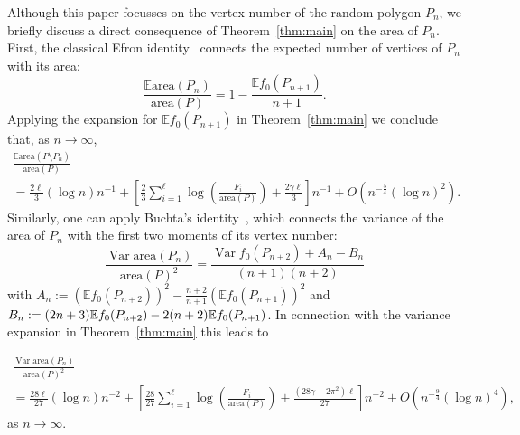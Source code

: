 \documentclass[AHL,Unicode,longabstracts,published]{cedram}
\newcommand{\var}{\operatorname{Var}}
\newcommand{\bbE}{\mathbb{E}}
\newcommand{\area}{\mathrm{area}}
\begin{document}
\begin{rema}
Although this paper focusses on the vertex number of the random polygon $P_n$, we briefly discuss a direct consequence of Theorem~\ref{thm:main} on the area of $P_n$. First, the classical Efron identity~\cite{Ef} connects the expected number of vertices of $P_n$ with its area:
\[
\frac{\bbE{\area}(P_n)}{{\area}(P)} = 1- \frac{\bbE f_0(P_{n+1})}{n+1}.
\]
Applying the expansion for $\bbE f_0(P_{n+1})$ in Theorem~\ref{thm:main} we conclude that, as $n\to\infty$,
\begin{multline*}
\frac{\bbE {\area}(P \setminus P_n)}{{\area}(P)} \\
= \frac{2 \ell}{3} (\log n)n^{-1}+ \left[\frac {2}3 \sum_{i=1}^\ell \log \left(\frac{F_i}{{\area}(P)}\right) + \frac{2 \gamma \ell }3 \right] n^{-1} + O\left(n^{-\frac 54} (\log n)^2\right).
\end{multline*}
Similarly, one can apply Buchta's identity~\cite[Corollary~1]{Bu11}, which connects the variance of the area of $P_n$ with the first two moments of its vertex number:
\[
\frac{\var{\area}(P_n)}{{\area}(P)^2} = \frac{\var f_0(P_{n+2})+A_n-B_n}{(n+1)(n+2)}
\]
with $A_n:=(\bbE f_0(P_{n+2}))^2-\frac{n+2}{n+1}(\bbE f_0(P_{n+1}))^2$ and $B_n:=(2n+3)\bbE f_0(P_{n+2})-2(n+2)\linebreak \bbE f_0(P_{n+1})$. In connection with the variance expansion in Theorem~\ref{thm:main} this leads to

\begin{multline*}
\frac {\var {\area}(P_n)}{{\area}(P)^2} \\ 
= \frac{28 \ell}{27} (\log n)n^{-2} +\left[\frac{28}{27}\sum_{i=1}^\ell \log \left(\frac{F_i}{{\area}(P)}\right) +
\frac{(28 \gamma -2 \pi^2)\ell }{27}\right]n^{-2}
 + O\left(n^{-\frac 94}(\log n)^4\right),
\end{multline*}
as $n\to\infty$.
\end{rema}
\end{document}
